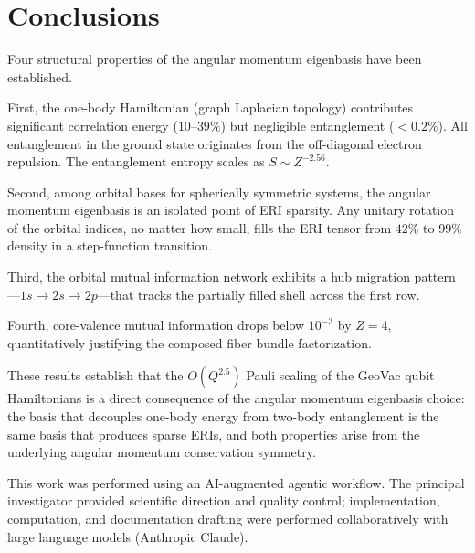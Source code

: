 \documentclass[twocolumn,pra,amsmath,amssymb,superscriptaddress]{revtex4-2}
\begin{document}
\section{Conclusions}
\label{sec:conclusions}

Four structural properties of the angular momentum eigenbasis
have been established.

First, the one-body Hamiltonian (graph Laplacian topology)
contributes significant correlation energy ($10$--$39\%$) but
negligible entanglement ($< 0.2\%$).  All entanglement in the
ground state originates from the off-diagonal electron repulsion.
The entanglement entropy scales as $S \sim Z^{-2.56}$.

Second, among orbital bases for spherically symmetric systems,
the angular momentum eigenbasis is an isolated point of ERI
sparsity.  Any unitary rotation of the orbital indices, no matter
how small, fills the ERI tensor from $42\%$ to $99\%$ density in
a step-function transition.

Third, the orbital mutual information network exhibits a hub
migration pattern---$1s \to 2s \to 2p$---that tracks the
partially filled shell across the first row.

Fourth, core-valence mutual information drops below $10^{-3}$
by $Z = 4$, quantitatively justifying the composed fiber bundle
factorization.

These results establish that the $O(Q^{2.5})$ Pauli scaling of
the GeoVac qubit Hamiltonians is a direct consequence of the
angular momentum eigenbasis choice: the basis that decouples
one-body energy from two-body entanglement is the same basis
that produces sparse ERIs, and both properties arise from the
underlying angular momentum conservation symmetry.


\begin{acknowledgments}
This work was performed using an AI-augmented agentic workflow.
The principal investigator provided scientific direction and quality
control; implementation, computation, and documentation drafting
were performed collaboratively with large language models (Anthropic
Claude).
\end{acknowledgments}

\end{document}
